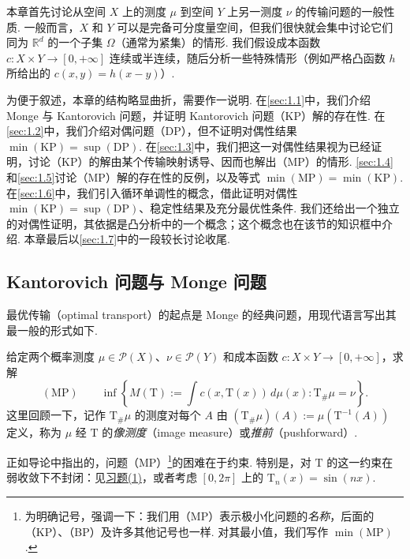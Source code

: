 本章首先讨论从空间 $X$ 上的测度 $\mu$ 到空间 $Y$ 上另一测度 $\nu$ 的传输问题的一般性质. 一般而言，$X$ 和 $Y$ 可以是完备可分度量空间，但我们很快就会集中讨论它们同为 $\mathbb R^d$ 的一个子集 $\Omega$（通常为紧集）的情形. 我们假设成本函数 $c:X\times Y\to[0,+\infty]$ 连续或半连续，随后分析一些特殊情形（例如严格凸函数 $h$ 所给出的 $c(x,y)=h(x-y)$）.

为便于叙述，本章的结构略显曲折，需要作一说明. 在\autoref{sec:1.1}中，我们介绍 Monge 与 Kantorovich 问题，并证明 Kantorovich 问题（KP）解的存在性. 在\autoref{sec:1.2}中，我们介绍对偶问题（DP），但不证明对偶性结果 $\min(\mathrm{KP})=\sup(\mathrm{DP})$. 在\autoref{sec:1.3}中，我们把这一对偶性结果视为已经证明，讨论（KP）的解由某个传输映射诱导、因而也解出（MP）的情形. \autoref{sec:1.4}和\autoref{sec:1.5}讨论（MP）解的存在性的反例，以及等式 $\min(\mathrm{MP})=\min(\mathrm{KP})$. 在\autoref{sec:1.6}中，我们引入循环单调性的概念，借此证明对偶性 $\min(\mathrm{KP})=\sup(\mathrm{DP})$、稳定性结果及充分最优性条件. 我们还给出一个独立的对偶性证明，其依据是凸分析中的一个概念；这个概念也在该节的知识框中介绍. 本章最后以\autoref{sec:1.7}中的一段较长讨论收尾.

\subsection{Kantorovich 问题与 Monge 问题}\label{sec:1.1}

最优传输（optimal transport）的起点是 Monge 的经典问题\cite{b239}，用现代语言写出其最一般的形式如下.

\begin{problem}\label{obj:1.1}
给定两个概率测度 $\mu\in\mathscr P(X)$、$\nu\in\mathscr P(Y)$ 和成本函数 $c:X\times Y\to[0,+\infty]$，求解
\begin{equation}\label{eq:1.1}
(\mathrm{MP})\qquad
\inf\left\{M(\mathrm{T}):=\int c(x,\mathrm{T}(x))\,d\mu(x):\mathrm{T}_\#\mu=\nu\right\}.
\end{equation}
这里回顾一下，记作 $\mathrm{T}_\#\mu$ 的测度对每个 $A$ 由 $(\mathrm{T}_\#\mu)(A):=\mu(\mathrm{T}^{-1}(A))$ 定义，称为 $\mu$ 经 $\mathrm{T}$ 的\emph{像测度}（image measure）或\emph{推前}（pushforward）.
\end{problem}

正如导论中指出的，问题（MP）\footnote{为明确记号，强调一下：我们用（MP）表示极小化问题的\emph{名称}，后面的（KP）、（BP）及许多其他记号也一样. 对其最小值，我们写作 $\min(\mathrm{MP})$.}的困难在于约束. 特别是，对 $\mathrm{T}$ 的这一约束在弱收敛下不封闭：见\hyperref[ex:1]{习题(1)}，或者考虑 $[0,2\pi]$ 上的 $\mathrm{T}_n(x)=\sin(nx)$.

